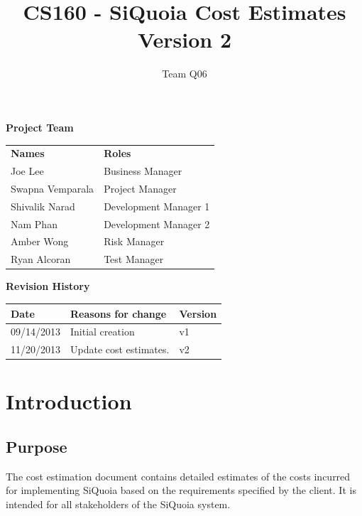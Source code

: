 \documentclass[12pt]{article}
\begin{document}
\title{CS160 - SiQuoia Cost Estimates \\ {\normalsize Version 2}}

\author{{\Large Team Q06}}

\begin{titlepage}
\maketitle

{\bf Project Team}
\begin{center}
\begin{tabular}{p{4cm} l}
{\bf Names}         & {\bf Roles} \\[.5em]
Joe Lee             & Business Manager \\[1em]
Swapna Vemparala    & Project Manager \\[1em]
Shivalik Narad      & Development Manager 1 \\[1em]
Nam Phan            & Development Manager 2 \\[1em]
Amber Wong          & Risk Manager \\[1em]
Ryan Alcoran        & Test Manager
\end{tabular}
\end{center}

{\bf Revision History}
\begin{center}
\begin{tabular}{|l|l|l|}
\hline
{\bf Date}      & {\bf Reasons for change}  & {\bf Version} \\
\hline
09/14/2013      & Initial creation          & v1 \\
\hline
11/20/2013      & Update cost estimates.    & v2 \\
\hline
\end{tabular}
\end{center}

\end{titlepage}

\section{Introduction}

\subsection{Purpose}
The cost estimation document contains detailed estimates of the costs
incurred for implementing SiQuoia based on the requirements specified
by the client. It is intended for all stakeholders of the SiQuoia
system.
\end{document}

